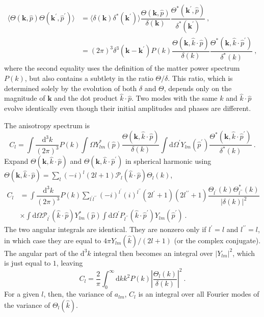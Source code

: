 \documentclass[12pt,a4paper]{article}
\renewcommand{\vec}[1]{\boldsymbol{#1}}
\newcommand{\dif}{\mathrm{d}}
\begin{document}
\begin{align}
\nonumber \langle \Theta(\vec{k}, \hat{p}) \Theta(\vec{k}^\prime, \hat{p}^\prime) \rangle &= \langle \delta(\vec{k}) \delta^\ast(\vec{k}^\prime) \rangle \dfrac{\Theta(\vec{k}, \hat{p})}{\delta(\vec{k})} \dfrac{\Theta^\ast(\vec{k}^\prime, \hat{p})}{\delta^\ast(\vec{k}^\prime)} ~, \\
&= (2\pi)^3 \delta^3(\vec{k} -\vec{k}^\prime) P(k) \dfrac{\Theta(\vec{k}, \hat{k}\cdot \hat{p})}{\delta(k)} \dfrac{\Theta^\ast(\vec{k}, \hat{k}\cdot\hat{p}^\prime)}{\delta^\ast(k)} ~,
\end{align}
where the second equality uses the definition of the matter power spectrum $P(k)$, but also contains a subtlety in the ratio $\Theta/\delta$. This ratio, which is determined solely by the evolution of both $\delta$ and $\Theta$, depends only on the magnitude of $\vec{k}$ and the dot product $\hat{k}\cdot \hat{p}$. Two modes with the same $k$ and $\hat{k}\cdot \hat{p}$ evolve identically even though their initial amplitudes and phases are different. 

The anisotropy spectrum is
\begin{equation}
C_l = \int \dfrac{\dif^3 k}{(2\pi)^3} P(k) \int \Omega Y_{lm}^\ast(\hat{p}) \dfrac{\Theta(\vec{k}, \hat{k}\cdot \hat{p})}{\delta(k)} \int \dif \Omega^\prime Y_{lm}(\hat{p}^\prime) \dfrac{\Theta^\ast(\vec{k}, \hat{k}\cdot\hat{p}^\prime)}{\delta^\ast(k)} ~.
\end{equation}
Expand $\Theta(\vec{k}, \hat{k}\cdot \hat{p})$ and $\Theta(\vec{k}, \hat{k}\cdot \hat{p}^\prime)$ in spherical harmonic using $\Theta(\vec{k}, \hat{k}\cdot \hat{p}) = \sum_l (-i)^{l} (2l+1) \mathcal P_l(\hat{k}\cdot \hat{p}) \Theta_l(k)$, 
\begin{align}
\nonumber C_l &= \int \dfrac{\dif^3 k}{(2\pi)^3} P(k) \sum_{l^\prime l^{\prime \prime}} (-i)^{l^\prime} (i)^{l^{\prime \prime}} (2l^\prime+ 1)(2l^{\prime \prime} +1) \dfrac{\Theta_{l^{\prime}}(k) \Theta^\ast_{l^{\prime \prime}}(k)}{|\delta(k)|^2} \\
&\times \int \dif \Omega \mathcal P_{l^{\prime}}(\hat{k}\cdot\hat{p}) Y_{lm}^\ast(\hat{p}) \int \dif \Omega^\prime P_{l^{\prime \prime}}(\hat{k}\cdot\hat{p}^\prime) Y_{lm}(\hat{p}^\prime) ~.
\end{align}
The two angular integrals are identical. They are nonzero only if $l^\prime = l$ and $l^{\prime \prime} = l$, in which case they are equal to $4\pi Y_{lm}(\hat{k})/(2l+1)$ (or the complex conjugate). The angular part of the $\dif^3 k$ integral then becomes an integral over $|Y_{lm}|^2$, which is just equal to $1$, leaving
\begin{equation}
C_l = \dfrac{2}{\pi} \int_0^\infty \dif k k^2 P(k) \left|\dfrac{\Theta_l(k)}{\delta(k)} \right|^2 ~.
\end{equation}
For a given $l$, then, the variance of $a_{lm}$, $C_l$ is an integral over all Fourier modes of the variance of $\Theta_l(\hat{k})$. 
\end{document}
